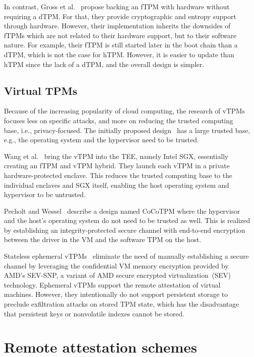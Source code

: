 In contrast, Gross et al.~\cite{Gross2021} propose backing an \ac{fTPM} with hardware without requiring a \ac{dTPM}.
For that, they provide cryptographic and entropy support through hardware.
However, their implementation inherits the downsides of \acp{fTPM} which are not related to their hardware support, but to their software nature.
For example, their \ac{fTPM} is still started later in the boot chain than a \ac{dTPM}, which is not the case for hTPM\@.
However, it is easier to update than hTPM since the lack of a dTPM, and the overall design is simpler.

\subsection{Virtual TPMs}

Because of the increasing popularity of cloud computing, the research of vTPMs focuses less on specific attacks, and more on reducing the trusted computing base, i.e., privacy-focused.
The initially proposed design~\cite{268868} has a large trusted base, e.g., the operating system and the hypervisor need to be trusted.

Wang et al.~\cite{Wang2019} bring the vTPM into the \ac{TEE}, namely Intel SGX, essentially creating an fTPM and vTPM hybrid.
They launch each vTPM in a private hardware-protected enclave.
This reduces the trusted computing base to the individual enclaves and SGX itself, enabling the host operating system and hypervisor to be untrusted.

Pecholt and Wessel~\cite{Pecholt2022} describe a design named CoCoTPM where the hypervisor and the host's operating system do not need to be trusted as well.
This is realized by establishing an integrity-protected secure channel with end-to-end encryption between the driver in the VM and the software TPM on the host.

Stateless ephemeral vTPMs~\cite{Narayanan2023} eliminate the need of manually establishing a secure channel by leveraging the confidential VM memory encryption provided by AMD's SEV-SNP, a variant of AMD secure encrypted virtualization~(SEV) technology.
Ephemeral vTPMs support the remote attestation of virtual machines.
However, they intentionally do not support persistent storage to preclude exfiltration attacks on stored TPM state, which has the disadvantage that persistent keys or nonvolatile indexes cannot be stored.

\section{Remote attestation schemes}

